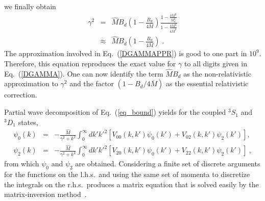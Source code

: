 we finally obtain
\begin{eqnarray}
\gamma^2 &=& \widehat{M} B_d \left( 1 - \frac{B_d}{4\overline{M}} \right)
           \frac{1-\frac{\delta M^2}{M_d^2}}
                {1-\frac{\delta M^2}{4\overline{M}^2}} \nonumber\\
 & \approx & \widehat{M} B_d \left( 1 - \frac{B_d}{4\overline{M}} \right) \; .
\label{DGAMMAPPR}
\end{eqnarray}
The approximation involved in Eq.~(\ref{DGAMMAPPR}) is
good to one part in $10^9$.
Therefore, this equation reproduces the exact value for $\gamma$
to all digits given in Eq.~(\ref{DGAMMA}).
One can now identify the term $\widehat{M}B_d$ as the non-relativistic
approximation to $\gamma^2$ and the factor $(1-B_d/4\overline{M})$ as the
essential relativistic correction. 

Partial wave decomposition of Eq.~(\ref{eq_bound})
yields for the coupled $^3S_1$ and $^3D_1$ states,
\begin{eqnarray}
  \psi_0(k) & = & -\frac{\widehat{M}}{\gamma^2+k^2} \int_0^\infty dk' k'^2
  \left[ V_{00}(k,k')\psi_0(k') + V_{02}(k,k')\psi_2(k') \right],
                                                            \nonumber\\
  \psi_2(k) & = & -\frac{\widehat{M}}{\gamma^2+k^2} \int_0^\infty dk' k'^2
  \left[ V_{20}(k,k')\psi_0(k') + V_{22}(k,k')\psi_2(k') \right]
\: ,
                                                            \label{DEQ}
\end{eqnarray}
from which $\psi_0$ and $\psi_2$ are obtained.
Considering a finite set of discrete arguments for the functions on the
l.h.s.\ and using the same set of momenta to discretize the integrals
on the r.h.s.\ produces a matrix equation that is solved easily by the
matrix-inversion method~\cite{HT70}.


